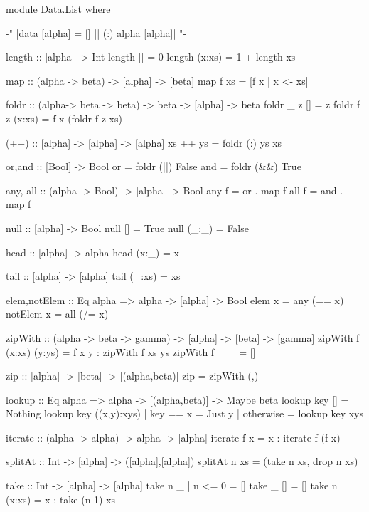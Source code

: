 \begin{code}
module Data.List where

{-" |data [alpha] = [] || (:) alpha [alpha]| "-}

length :: [alpha] -> Int
length []      = 0
length (x:xs)  = 1 + length xs

map :: (alpha -> beta) -> [alpha] -> [beta]
map f xs = [f x | x <- xs]

foldr :: (alpha-> beta -> beta) -> beta -> [alpha] -> beta
foldr _ z []      = z
foldr f z (x:xs)  = f x (foldr f z xs)

(++) :: [alpha] -> [alpha] -> [alpha]
xs ++ ys = foldr (:) ys xs

or,and :: [Bool] -> Bool
or   = foldr (||)  False
and  = foldr (&&)  True

any, all :: (alpha -> Bool) -> [alpha] -> Bool
any  f = or   . map f
all  f = and  . map f

null :: [alpha] -> Bool
null []     =  True
null (_:_)  =  False

head :: [alpha] -> alpha
head (x:_) = x

tail :: [alpha] -> [alpha]
tail (_:xs) = xs

elem,notElem :: Eq alpha => alpha -> [alpha] -> Bool
elem     x = any  (==  x)
notElem  x = all  (/=  x)

zipWith :: (alpha -> beta -> gamma) -> [alpha] -> [beta] -> [gamma]
zipWith f (x:xs) (y:ys) = f x y : zipWith f xs ys
zipWith f _ _ = []

zip :: [alpha] -> [beta] -> [(alpha,beta)]
zip = zipWith (,)

lookup :: Eq alpha => alpha -> [(alpha,beta)] -> Maybe beta
lookup key []           =  Nothing
lookup key ((x,y):xys)  | key == x   = Just y
                        | otherwise  = lookup key xys

iterate :: (alpha -> alpha) -> alpha -> [alpha]
iterate f x =  x : iterate f (f x)

splitAt :: Int -> [alpha] -> ([alpha],[alpha])
splitAt n xs = (take n xs, drop n xs)

take :: Int -> [alpha] -> [alpha]
take n _  | n <= 0  = []
take _ []           = []
take n (x:xs)       = x : take (n-1) xs


\end{code}
